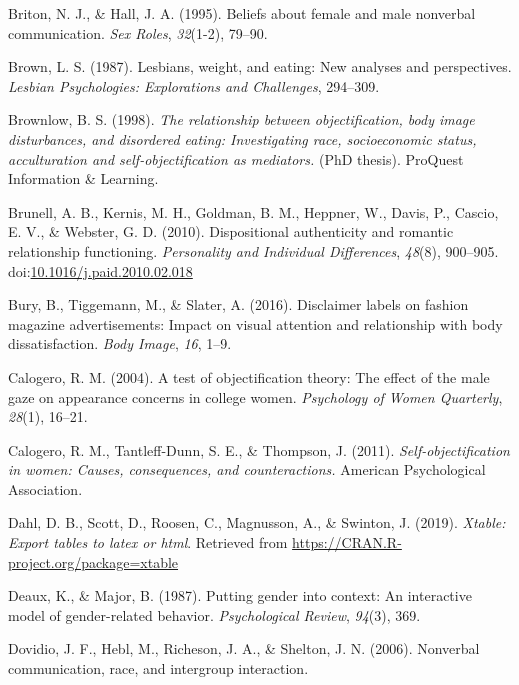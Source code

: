 \documentclass[
  man]{apa6}
\begin{document}
\leavevmode\hypertarget{ref-briton1995}{}%
Briton, N. J., \& Hall, J. A. (1995). Beliefs about female and male nonverbal communication. \emph{Sex Roles}, \emph{32}(1-2), 79--90.

\leavevmode\hypertarget{ref-brown1987lesbians}{}%
Brown, L. S. (1987). Lesbians, weight, and eating: New analyses and perspectives. \emph{Lesbian Psychologies: Explorations and Challenges}, 294--309.

\leavevmode\hypertarget{ref-brownlow1998relationship}{}%
Brownlow, B. S. (1998). \emph{The relationship between objectification, body image disturbances, and disordered eating: Investigating race, socioeconomic status, acculturation and self-objectification as mediators.} (PhD thesis). ProQuest Information \& Learning.

\leavevmode\hypertarget{ref-brunelletal2010}{}%
Brunell, A. B., Kernis, M. H., Goldman, B. M., Heppner, W., Davis, P., Cascio, E. V., \& Webster, G. D. (2010). Dispositional authenticity and romantic relationship functioning. \emph{Personality and Individual Differences}, \emph{48}(8), 900--905. doi:\href{https://doi.org/10.1016/j.paid.2010.02.018}{10.1016/j.paid.2010.02.018}

\leavevmode\hypertarget{ref-bury2016}{}%
Bury, B., Tiggemann, M., \& Slater, A. (2016). Disclaimer labels on fashion magazine advertisements: Impact on visual attention and relationship with body dissatisfaction. \emph{Body Image}, \emph{16}, 1--9.

\leavevmode\hypertarget{ref-calogero2004test}{}%
Calogero, R. M. (2004). A test of objectification theory: The effect of the male gaze on appearance concerns in college women. \emph{Psychology of Women Quarterly}, \emph{28}(1), 16--21.

\leavevmode\hypertarget{ref-calogero2011}{}%
Calogero, R. M., Tantleff-Dunn, S. E., \& Thompson, J. (2011). \emph{Self-objectification in women: Causes, consequences, and counteractions.} American Psychological Association.

\leavevmode\hypertarget{ref-R-xtable}{}%
Dahl, D. B., Scott, D., Roosen, C., Magnusson, A., \& Swinton, J. (2019). \emph{Xtable: Export tables to latex or html}. Retrieved from \url{https://CRAN.R-project.org/package=xtable}

\leavevmode\hypertarget{ref-deaux1987putting}{}%
Deaux, K., \& Major, B. (1987). Putting gender into context: An interactive model of gender-related behavior. \emph{Psychological Review}, \emph{94}(3), 369.

\leavevmode\hypertarget{ref-dovidio2006nonverbal}{}%
Dovidio, J. F., Hebl, M., Richeson, J. A., \& Shelton, J. N. (2006). Nonverbal communication, race, and intergroup interaction.
\end{document}
